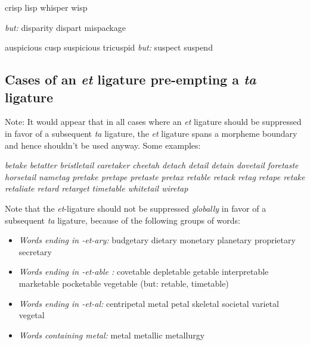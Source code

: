 crisp lisp whisper wisp


\emph{but:} disparity dispart mispackage 

auspicious cusp suspicious tricuspid \emph{but:} suspect suspend 

\egroup


\subsection*{Cases of an \emph{et} ligature pre-empting a \emph{ta} ligature}

Note: It would appear that in all cases where an \emph{et} ligature should be suppressed in favor of a subsequent \emph{ta} ligature, the \emph{et} ligature spans a morpheme boundary and hence shouldn't be used anyway. Some examples:

\bgroup \em
betake betatter bristletail caretaker cheetah 
detach detail detain dovetail 
foretaste horsetail nametag pretake
pretape pretaste pretax retable retack
retag retape retake retaliate retard retarget timetable
whitetail wiretap

\egroup
\medskip
Note that the \emph{et}-ligature should not be suppressed \emph{globally} in favor of a subsequent \emph{ta} ligature, because of the following groups of words:

\bgroup \em
\begin{itemize}
\item \emph{Words ending in -et-ary:} 
budgetary dietary monetary planetary proprietary secretary

\item \emph{Words ending in -et-able :}
covetable depletable getable interpretable marketable pocketable vegetable (but: retable, timetable)

\item \emph{Words ending in -et-al:} centripetal 
metal petal skeletal societal varietal vegetal

\item \emph{Words containing metal:} metal metallic metallurgy
\end{itemize}
\egroup
